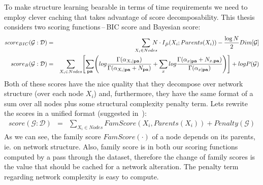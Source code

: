 \documentclass[english,cover]{fitthesis} %
\newcommand{\vars}[1]{{\bold{#1}}}         %
\begin{document}
To make structure learning bearable in terms of time requirements we need to employ clever caching that takes advantage of score decomposability. This thesis considers two scoring functions\,--\,BIC score and Bayesian score:
\begin{eqnarray*}
    score_{BIC}(\mathcal{G} : \mathcal{D})
    & = & \sum_{X_i \in Nodes} \!\!\!\!\!\! N \cdot I_{\hat P}(X_i;Parents(X_i))
    - \frac{\log N}{2} Dim[\mathcal{G}]\\
    score_B(\mathcal{G} : \mathcal{D})
    & = &
      \sum_{X_i \in Nodes}
             \Biggl[
                \sum_{\vars{pa}}
                   \Biggl(
                      log \frac{\Gamma(\alpha_{X_i \mid \vars{pa}})}{\Gamma(\alpha_{X_i \mid \vars{pa}} + N_{\vars{pa}})}
                      + \sum_{x} log \frac{\Gamma(\alpha_{x \mid \vars{pa}} + N_{x, \vars{pa}})}{\Gamma(\alpha_{x \mid \vars{pa}})}
                   \Biggr)
             \Biggr]
      + log P(\mathcal{G})
\end{eqnarray*}
Both of these scores have the nice quality that they decompose over network structure (over each node $X_i$) and, furthermore, they have the same format of a sum over all nodes plus some structural complexity penalty term. Lets rewrite the scores in a unified format (suggested in~\cite[p.~818]{pgm}):
\begin{eqnarray*}
    score(\mathcal{G} : \mathcal{D})
    & = & \sum_{X_i \in Nodes} \!\!\!\!\!\! FamScore(X_i, Parents(X_i))
    + Penalty(\mathcal{G})
\end{eqnarray*}
As we can see, the family score $FamScore(\cdot)$ of a node depends on its parents, ie. on network structure. Also, family score is in both our scoring functions computed by a pass through the dataset, therefore the change of family scores is the value that should be cached for a network alteration. The penalty term regarding network complexity is easy to compute.
\end{document}
